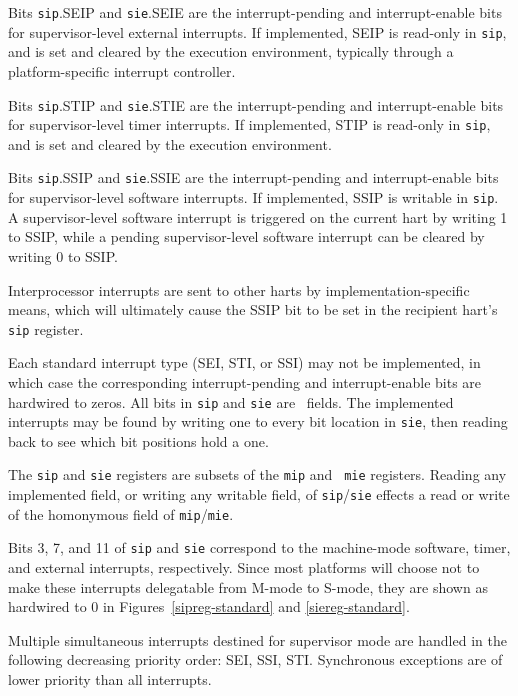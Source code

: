 Bits {\tt sip}.SEIP and {\tt sie}.SEIE are the interrupt-pending and
interrupt-enable bits for supervisor-level external interrupts.
If implemented, SEIP is read-only in {\tt sip}, and is set and cleared by
the execution environment, typically through a platform-specific
interrupt controller.

Bits {\tt sip}.STIP and {\tt sie}.STIE are the interrupt-pending and
interrupt-enable bits for supervisor-level timer interrupts.
If implemented, STIP is read-only in {\tt sip}, and is set and cleared by
the execution environment.

Bits {\tt sip}.SSIP and {\tt sie}.SSIE are the interrupt-pending and
interrupt-enable bits for supervisor-level software interrupts.
If implemented, SSIP is writable in {\tt sip}.
A supervisor-level software interrupt is triggered
on the current hart by writing 1 to SSIP,
while a pending supervisor-level software
interrupt can be cleared by writing 0 to SSIP.

\begin{commentary}
Interprocessor interrupts are sent to other harts by implementation-specific
means, which will ultimately cause the SSIP bit to be set in the recipient
hart's {\tt sip} register.
\end{commentary}

Each standard interrupt type (SEI, STI, or SSI) may not be implemented,
in which case the corresponding interrupt-pending and interrupt-enable
bits are hardwired to zeros.
All bits in {\tt sip} and {\tt sie} are \warl\ fields.
The implemented interrupts may be found by writing one to every bit
location in {\tt sie}, then reading back to see which bit positions hold
a one.

\begin{commentary}
The {\tt sip} and {\tt sie} registers are subsets of the {\tt mip} and {\tt
mie} registers.  Reading any implemented field,
or writing any writable field, of {\tt sip}/{\tt sie}
effects a read or write of the homonymous field of {\tt mip}/{\tt mie}.

Bits 3, 7, and 11 of {\tt sip} and {\tt sie} correspond to the machine-mode
software, timer, and external interrupts, respectively.  Since most platforms
will choose not to make these interrupts delegatable from M-mode to S-mode,
they are shown as hardwired to 0 in Figures~\ref{sipreg-standard} and
\ref{siereg-standard}.
\end{commentary}

Multiple simultaneous
interrupts destined for supervisor mode are handled in the following
decreasing priority order: SEI, SSI, STI.
Synchronous exceptions are of lower priority than all interrupts.

